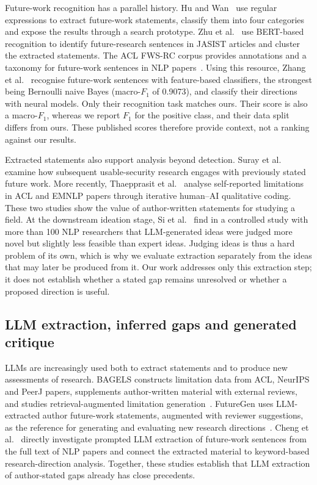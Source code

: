 Future-work recognition has a parallel history. Hu and Wan~\cite{hu2015futureworks} use regular expressions to extract future-work statements, classify them into four categories and expose the results through a search prototype. Zhu et al.~\cite{zhu2019recognizing} use BERT-based recognition to identify future-research sentences in JASIST articles and cluster the extracted statements. The ACL FWS-RC corpus provides annotations and a taxonomy for future-work sentences in NLP papers~\cite{hao2020acl}. Using this resource, Zhang et al.~\cite{zhang2023fws} recognise future-work sentences with feature-based classifiers, the strongest being Bernoulli naive Bayes (macro-$F_1$ of 0.9073), and classify their directions with neural models. Only their recognition task matches ours. Their score is also a macro-$F_1$, whereas we report $F_1$ for the positive class, and their data split differs from ours. These published scores therefore provide context, not a ranking against our results.

Extracted statements also support analysis beyond detection. Suray et al.~\cite{suray2024future} examine how subsequent usable-security research engages with previously stated future work. More recently, Thaepprasit et al.~\cite{thaepprasit2026limits} analyse self-reported limitations in ACL and EMNLP papers through iterative human--AI qualitative coding. These two studies show the value of author-written statements for studying a field. At the downstream ideation stage, Si et al.~\cite{si2025ideas} find in a controlled study with more than 100 NLP researchers that LLM-generated ideas were judged more novel but slightly less feasible than expert ideas. Judging ideas is thus a hard problem of its own, which is why we evaluate extraction separately from the ideas that may later be produced from it. Our work addresses only this extraction step; it does not establish whether a stated gap remains unresolved or whether a proposed direction is useful.

\subsection{LLM extraction, inferred gaps and generated critique}

LLMs are increasingly used both to extract statements and to produce new assessments of research. BAGELS constructs limitation data from ACL, NeurIPS and PeerJ papers, supplements author-written material with external reviews, and studies retrieval-augmented limitation generation~\cite{alazher2025bagels}. FutureGen uses LLM-extracted author future-work statements, augmented with reviewer suggestions, as the reference for generating and evaluating new research directions~\cite{alazher2025futuregen}. Cheng et al.~\cite{cheng2026future} directly investigate prompted LLM extraction of future-work sentences from the full text of NLP papers and connect the extracted material to keyword-based research-direction analysis. Together, these studies establish that LLM extraction of author-stated gaps already has close precedents.

